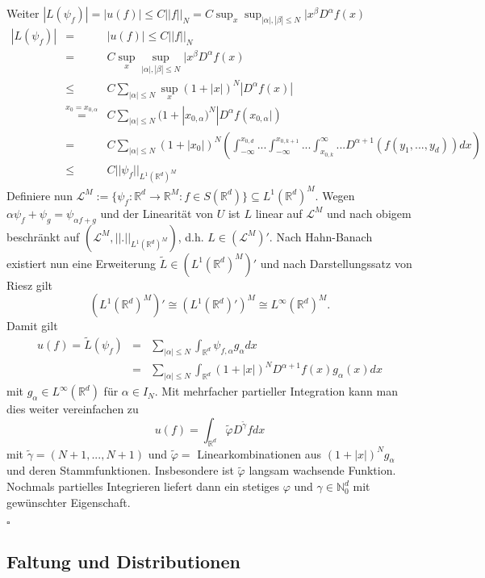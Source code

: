 \documentclass[12pt,a4paper,titlepage]{scrartcl}
\numberwithin{equation}{section}
\newcommand{\R}{\mathbb{R}} %
\newcommand{\N}{\mathbb{N}} %
\newcommand{\qed}{\begin{flushright}
		$\square$
	\end{flushright}}
\begin{document}
\begin{enumerate}
		Weiter $|L(\psi_f)| = |u(f)|\leq C||f||_N = C\sup_x \sup_{|\alpha|,|\beta|\leq N}|x^\beta D^\alpha f(x)$
		\begin{eqnarray}
			|L(\psi_f)| &=& |u(f)|\leq C||f||_N\nonumber\\
			&=& C\sup_x \sup_{|\alpha|,|\beta|\leq N}|x^\beta D^\alpha f(x)\nonumber\\
			&\leq & C\sum_{|\alpha|\leq N} \sup_x(1+|x|)^N|D^\alpha f(x)|\nonumber\\
			&\overset{x_0 = x_{0,\alpha}}{=}& C\sum_{|\alpha|\leq N} (1+|x_{0,\alpha})^N|D^\alpha f(x_{0,\alpha}|)\nonumber\\
			&=& C \sum_{|\alpha|\leq N} (1+|x_0|)^N \left( \int_{-\infty}^{x_{0,d}}...\int_{-\infty}^{x_{0,k+1}}...\int_{x_{0,k}}^{\infty}... D^{\alpha+1}(f(y_1,...,y_d))dx  \right)\nonumber\\
			&\leq& C||\psi_f||_{L^1(\R^d)^M}\nonumber
		\end{eqnarray}
		Definiere nun $\mathcal{L}^M:=\{\psi_f:\R^d\rightarrow\R^M: f\in S(\R^d) \}\subseteq L^1(\R^d)^M$. Wegen $\alpha\psi_f+\psi_g = \psi_{\alpha f+g}$ und der Linearität von $U$ ist $L$ linear auf $\mathcal{L}^M$ und nach obigem beschränkt auf $(\mathcal{L}^M,||.||_{L^1(\R^d)^M})$, d.h. $L\in (\mathcal{L}^{M})'$. Nach Hahn-Banach existiert nun eine Erweiterung $\tilde{L}\in (L^1(\R^d)^M)'$ und nach Darstellungssatz von Riesz gilt
		$$(L^1(\R^d)^M)'\cong (L^1(\R^d)')^M\cong L^\infty(\R^d)^M.$$
		Damit gilt 
		\begin{eqnarray}
			u(f) = \tilde{L}(\psi_f) &=& \sum_{|\alpha|\leq N}\int_{\R^d}\psi_{f,\alpha}g_\alpha dx\nonumber\\
			&=&\sum_{|\alpha|\leq N}\int_{\R^d} (1+|x|)^N D^{\alpha + 1}f(x) g_\alpha(x) dx\nonumber
		\end{eqnarray}
		mit $g_\alpha\in L^\infty(\R^d)$ für $\alpha\in I_N$.
		Mit mehrfacher partieller Integration kann man dies weiter vereinfachen zu
		$$u(f) = \int_{\R^d} \tilde{\varphi}D^{\tilde{\gamma}}f dx$$
		mit $\tilde{\gamma} = (N+1,...,N+1)$ und $\tilde{\varphi}=$ Linearkombinationen aus $(1+|x|)^Ng_\alpha$ und deren Stammfunktionen. Insbesondere ist $\tilde{\varphi}$ langsam wachsende Funktion. Nochmals partielles Integrieren liefert dann ein stetiges $\varphi$ und $\gamma\in \N_0^d$ mit gewünschter Eigenschaft.
	\end{enumerate}
	\qed
	
	\subsection{Faltung und Distributionen}
	
\end{document}
